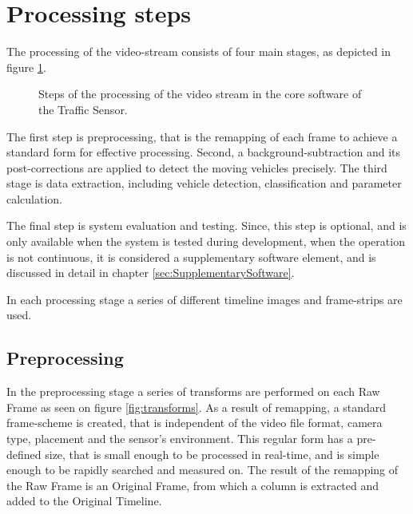 \section{Processing steps}
The processing of the video-stream consists of four main stages, as depicted in figure \ref{fig:processing_steps}.

\begin{figure}[bh]
	\centering
	
	\caption{Steps of the processing of the video stream in the core software of the Traffic Sensor.\label{fig:processing_steps}}
\end{figure}

The first step is preprocessing, that is the remapping of each frame to achieve a standard form for effective processing.
Second, a background-subtraction and its post-corrections are applied to detect the moving vehicles precisely.
The third stage is data extraction, including vehicle detection, classification and parameter calculation.

The final step is system evaluation and testing. 
Since, this step is optional, and is only available when the system is tested during development, when the operation is not continuous, it is considered a supplementary software element, and is discussed in detail in chapter \ref{sec:SupplementarySoftware}.

In each processing stage a series of different timeline images and frame-strips are used.
\subsection{Preprocessing}
In the preprocessing stage a series of transforms are performed on each Raw Frame as seen on figure \ref{fig:transforms}.
As a result of remapping, a standard frame-scheme is created, that is independent of the video file format, camera type, placement and the sensor's environment.
This regular form has a pre-defined size, that is small enough to be processed in real-time, and is simple enough to be rapidly searched and measured on.
The result of the remapping of the Raw Frame is an Original Frame, from which a column is extracted and added to the Original Timeline.

